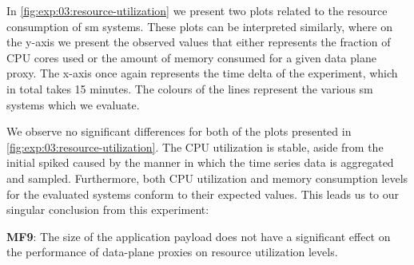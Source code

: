 In \cref{fig:exp:03:resource-utilization} we present two plots related to the resource consumption of \gls{sm} systems. These plots can be interpreted similarly, where on the y-axis we present the observed values that either represents the fraction of CPU cores used or the amount of memory consumed for a given data plane proxy. The x-axis once again represents the time delta of the experiment, which in total takes 15 minutes. The colours of the lines represent the various \gls{sm} systems which we evaluate.

We observe no significant differences for both of the plots presented in \cref{fig:exp:03:resource-utilization}. The CPU utilization is stable, aside from the initial spiked caused by the manner in which the time series data is aggregated and sampled. Furthermore, both CPU utilization and memory consumption levels for the evaluated systems conform to their expected values. This leads us to our singular conclusion from this experiment:

\begin{shaded*}
    \noindent
    \textbf{MF9}:
    The size of the application payload does not have a significant effect on the performance of data-plane proxies on resource utilization levels.
\end{shaded*}

